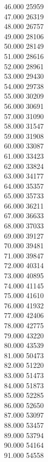 { 46.000	25959 \\
 47.000	26319 \\
 48.000	26757 \\
 49.000	28106 \\
 50.000	28149 \\
 51.000	28616 \\
 52.000	28961 \\
 53.000	29430 \\
 54.000	29738 \\
 55.000	30209 \\
 56.000	30691 \\
 57.000	31090 \\
 58.000	31547 \\
 59.000	31908 \\
 60.000	33087 \\
 61.000	33423 \\
 62.000	33824 \\
 63.000	34177 \\
 64.000	35357 \\
 65.000	35733 \\
 66.000	36211 \\
 67.000	36633 \\
 68.000	37033 \\
 69.000	39127 \\
 70.000	39481 \\
 71.000	39847 \\
 72.000	40314 \\
 73.000	40895 \\
 74.000	41145 \\
 75.000	41610 \\
 76.000	41932 \\
 77.000	42406 \\
 78.000	42775 \\
 79.000	43220 \\
 80.000	43539 \\
 81.000	50473 \\
 82.000	51220 \\
 83.000	51473 \\
 84.000	51873 \\
 85.000	52285 \\
 86.000	52650 \\
 87.000	53097 \\
 88.000	53457 \\
 89.000	53794 \\
 90.000	54164 \\
 91.000	54558 \\
}
